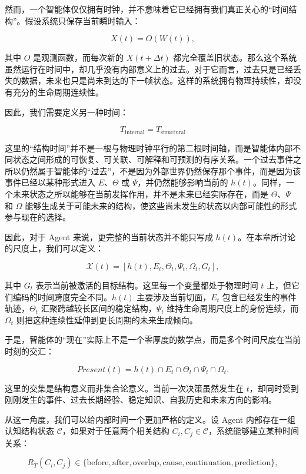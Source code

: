 然而，一个智能体仅仅拥有时钟，并不意味着它已经拥有我们真正关心的“时间结构”。假设系统只保存当前瞬时输入：

\[
X(t)=O(W(t)),
\]

其中 $O$ 是观测函数，而每次新的 $X(t+\Delta t)$ 都完全覆盖旧状态。那么这个系统虽然运行在时间中，却几乎没有内部意义上的过去。对于它而言，过去只是已经丢失的数据，未来也只是尚未到达的下一帧状态。这样的系统拥有物理持续性，却没有充分的生命周期连续性。

因此，我们需要定义另一种时间：

\[
\boxed{
T_{\mathrm{internal}}
=
T_{\mathrm{structural}}
}
\]

这里的“结构时间”并不是一根与物理时钟平行的第二根时间轴，而是智能体内部不同状态之间形成的可恢复、可关联、可解释和可预测的有序关系。一个过去事件之所以仍然属于智能体的“过去”，不是因为外部世界仍然保存那个事件，而是因为该事件已经以某种形式进入 $E$、$\Theta$ 或 $\Psi$，并仍然能够影响当前的 $h(t)$。同样，一个未来状态之所以能够在当前发挥作用，并不是未来已经实际存在，而是 $\Theta$、$\Psi$ 和 $\Omega$ 能够生成关于可能未来的结构，使这些尚未发生的状态以内部可能性的形式参与现在的选择。

因此，对于 Agent 来说，更完整的当前状态并不能只写成 $h(t)$。在本章所讨论的尺度上，我们可以定义：

\[
\mathcal{X}(t)
=
\left[
h(t),
E_t,
\Theta_t,
\Psi_t,
\Omega_t,
G_t
\right],
\]

其中 $G_t$ 表示当前被激活的目标结构。这里每一个变量都处于物理时间 $t$ 上，但它们编码的时间跨度完全不同。$h(t)$ 主要涉及当前切面，$E_t$ 包含已经发生的事件轨迹，$\Theta_t$ 汇聚跨越较长区间的稳定结构，$\Psi_t$ 维持生命周期尺度上的身份连续，而 $\Omega_t$ 则把这种连续性延伸到更长周期的未来生成倾向。

于是，智能体的“现在”实际上不是一个零厚度的数学点，而是多个时间尺度在当前时刻的交汇：

\[
\boxed{
Present(t)
=
h(t)
\cap
E_t
\cap
\Theta_t
\cap
\Psi_t
\cap
\Omega_t.
}
\]

这里的交集是结构意义而非集合论意义。当前一次决策虽然发生在 $t$，却同时受到刚刚发生的事件、过去长期经验、稳定知识、自我历史和未来方向的影响。

从这一角度，我们可以给内部时间一个更加严格的定义。设 Agent 内部存在一组认知结构状态 $\mathcal{C}$，如果对于任意两个相关结构 $C_i,C_j\in\mathcal{C}$，系统能够建立某种时间关系：

\[
R_T(C_i,C_j)
\in
\{
\text{before},
\text{after},
\text{overlap},
\text{cause},
\text{continuation},
\text{prediction}
\},
\]

